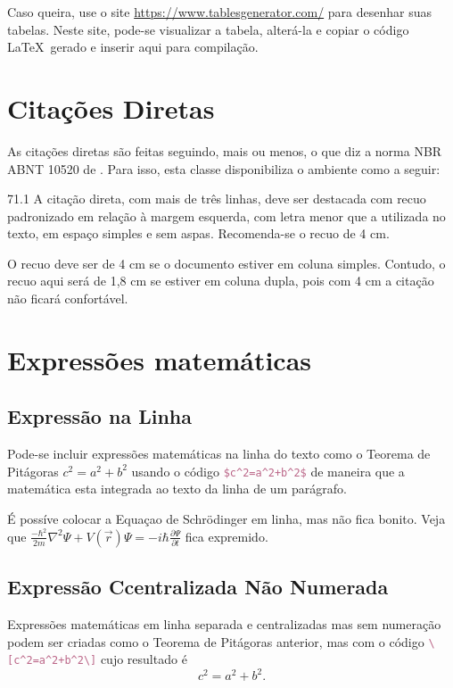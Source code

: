         
        
        Caso queira, use o site \href{https://www.tablesgenerator.com/}{https://www.tablesgenerator.com/}  para desenhar suas tabelas. Neste site, pode-se visualizar a tabela, alterá-la e copiar o código \LaTeX\ gerado e inserir aqui para compilação. 
        
        \section{Citações Diretas\label{sec:citacoes}}

 As citações diretas são feitas seguindo, mais ou menos, o que diz a norma NBR ABNT 10520 de \citeyear{NBR10520:2023} \cite{NBR10520:2023}. Para isso, esta classe disponibiliza o ambiente  como a seguir:
\begin{citacao}
 71.1 A citação direta, com mais de três linhas, deve ser destacada com recuo padronizado em relação à margem esquerda, com letra menor que a utilizada no texto, em espaço simples e sem aspas. Recomenda-se o recuo de 4 cm. \cite[p. 12]{NBR10520:2023}
\end{citacao}

O recuo deve ser de 4 cm se o documento estiver em coluna simples. Contudo, o recuo aqui será de 1,8 cm se estiver em coluna dupla, pois com 4 cm a citação não ficará confortável.

\section{Expressões matemáticas}

\subsection{Expressão na Linha}

Pode-se incluir expressões matemáticas na linha do texto como o Teorema de Pitágoras $c^2=a^2+b^2$ usando o código \lstinline[language=TeX]|$c^2=a^2+b^2$|  de maneira que a matemática esta integrada ao texto da linha de um parágrafo. 

É possíve colocar a Equaçao de Schrödinger em linha, mas não fica bonito. Veja que $\frac{-\hbar^2}{2m}\nabla^2\Psi + V\left(\vec{r}\right)\Psi = -i\hbar \frac{\partial\Psi}{\partial t}$ fica expremido.

\subsection{Expressão Ccentralizada Não Numerada}
Expressões matemáticas em linha separada e centralizadas mas sem numeração podem ser criadas como o Teorema de Pitágoras anterior, mas com o código \lstinline[language=TeX]|\[c^2=a^2+b^2\]| cujo resultado é \[c^2=a^2+b^2.\]

